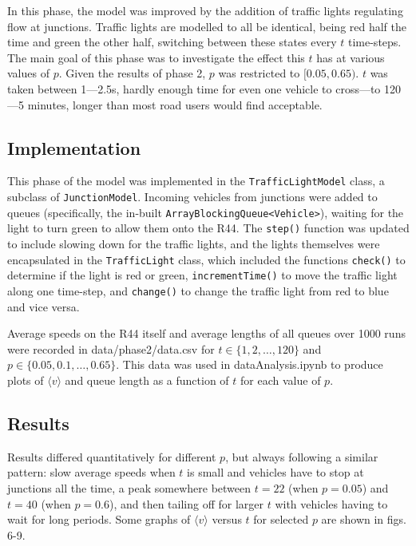 \documentclass{article}
\begin{document}
In this phase, the model was improved by the addition of traffic lights regulating flow at junctions. Traffic lights are modelled to all be identical, being red half the time and green the other half, switching between these states every $t$ time-steps. The main goal of this phase was to investigate the effect this $t$ has at various values of $p$. Given the results of phase 2, $p$ was restricted to $[0.05, 0.65)$. $t$ was taken between 1---2.5s, hardly enough time for even one vehicle to cross---to 120---5 minutes, longer than most road users would find acceptable.

\subsection*{Implementation}

This phase of the model was implemented in the \texttt{TrafficLightModel} class, a subclass of \texttt{JunctionModel}. Incoming vehicles from junctions were added to queues (specifically, the in-built \texttt{ArrayBlockingQueue<Vehicle>}), waiting for the light to turn green to allow them onto the R44. The \texttt{step()} function was updated to include slowing down for the traffic lights, and the lights themselves were encapsulated in the \texttt{TrafficLight} class, which included the functions \texttt{check()} to determine if the light is red or green, \texttt{incrementTime()} to move the traffic light along one time-step, and \texttt{change()} to change the traffic light from red to blue and vice versa.

Average speeds on the R44 itself and average lengths of all queues over 1000 runs were recorded in data/phase2/data.csv for $t \in \{1, 2, \dots , 120\}$ and $p \in \{0.05, 0.1, \dots , 0.65\}$. This data was used in dataAnalysis.ipynb to produce plots of $\langle v \rangle$ and queue length as a function of $t$ for each value of $p$.

\subsection*{Results}

Results differed quantitatively for different $p$, but always following a similar pattern: slow average speeds when $t$ is small and vehicles have to stop at junctions all the time, a peak somewhere between $t=22$ (when $p=0.05$) and $t=40$ (when $p=0.6$), and then tailing off for larger $t$ with vehicles having to wait for long periods. Some graphs of $\langle v \rangle$ versus $t$ for selected $p$ are shown in figs. 6-9.
\end{document}
